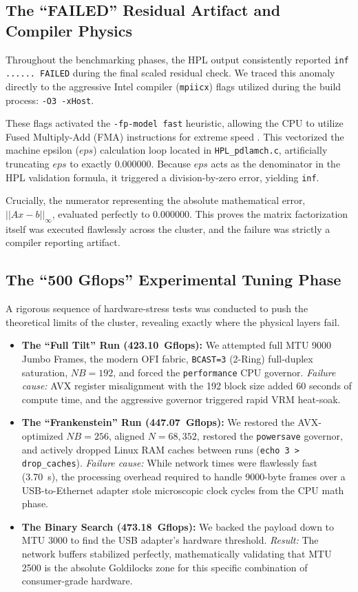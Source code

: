 \documentclass[11pt]{article}
\begin{document}
\subsection{The ``FAILED'' Residual Artifact and Compiler Physics}
Throughout the benchmarking phases, the HPL output consistently reported \texttt{inf ...... FAILED} during the final scaled residual check. We traced this anomaly directly to the aggressive Intel compiler (\texttt{mpiicx}) flags utilized during the build process: \texttt{-O3 -xHost}.

These flags activated the \texttt{-fp-model fast} heuristic, allowing the CPU to utilize Fused Multiply-Add (FMA) instructions for extreme speed . This vectorized the machine epsilon ($eps$) calculation loop located in \texttt{HPL\_pdlamch.c}, artificially truncating $eps$ to exactly $0.000000$. Because $eps$ acts as the denominator in the HPL validation formula, it triggered a division-by-zero error, yielding \texttt{inf}.

Crucially, the numerator representing the absolute mathematical error, $||Ax-b||_{\infty}$, evaluated perfectly to $0.000000$. This proves the matrix factorization itself was executed flawlessly across the cluster, and the failure was strictly a compiler reporting artifact.

\subsection{The ``500 Gflops'' Experimental Tuning Phase}
A rigorous sequence of hardware-stress tests was conducted to push the theoretical limits of the cluster, revealing exactly where the physical layers fail.

\begin{itemize}
  \item \textbf{The ``Full Tilt'' Run (\SI{423.10}{Gflops}):} We attempted full MTU 9000 Jumbo Frames, the modern OFI fabric, \texttt{BCAST=3} (2-Ring) full-duplex saturation, $NB=192$, and forced the \texttt{performance} CPU governor. \textit{Failure cause:} AVX register misalignment with the 192 block size added 60 seconds of compute time, and the aggressive governor triggered rapid VRM heat-soak.
  \item \textbf{The ``Frankenstein'' Run (\SI{447.07}{Gflops}):} We restored the AVX-optimized $NB=256$, aligned $N=68,352$, restored the \texttt{powersave} governor, and actively dropped Linux RAM caches between runs (\texttt{echo 3 > drop\_caches}). \textit{Failure cause:} While network times were flawlessly fast (\SI{3.70}{\second}), the processing overhead required to handle 9000-byte frames over a USB-to-Ethernet adapter stole microscopic clock cycles from the CPU math phase.
  \item \textbf{The Binary Search (\SI{473.18}{Gflops}):} We backed the payload down to MTU 3000 to find the USB adapter's hardware threshold. \textit{Result:} The network buffers stabilized perfectly, mathematically validating that MTU 2500 is the absolute Goldilocks zone for this specific combination of consumer-grade hardware.
\end{itemize}
\end{document}
